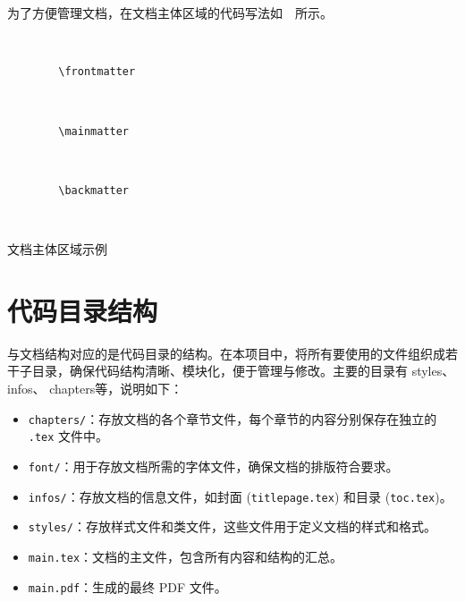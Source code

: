 为了方便管理文档，在文档主体区域的代码写法如~~所示。
\begin{listing}[H]
    \begin{verbatim}
        
        
        \frontmatter
        
        
        
        \mainmatter
        
        
        
        \backmatter
        
        
    \end{verbatim}
    \caption{文档主体区域示例}
\end{listing}

\section{代码目录结构}
与文档结构对应的是代码目录的结构。在本项目中，将所有要使用的文件组织成若干子目录，确保代码结构清晰、模块化，便于管理与修改。主要的目录有 styles、 infos、 chapters等，说明如下：

\begin{itemize}
  \item \texttt{chapters/}：存放文档的各个章节文件，每个章节的内容分别保存在独立的 \texttt{.tex} 文件中。
  \item \texttt{font/}：用于存放文档所需的字体文件，确保文档的排版符合要求。
  \item \texttt{infos/}：存放文档的信息文件，如封面 (\texttt{titlepage.tex}) 和目录 (\texttt{toc.tex})。
  \item \texttt{styles/}：存放样式文件和类文件，这些文件用于定义文档的样式和格式。
  \item \texttt{main.tex}：文档的主文件，包含所有内容和结构的汇总。
  \item \texttt{main.pdf}：生成的最终 PDF 文件。
\end{itemize}
